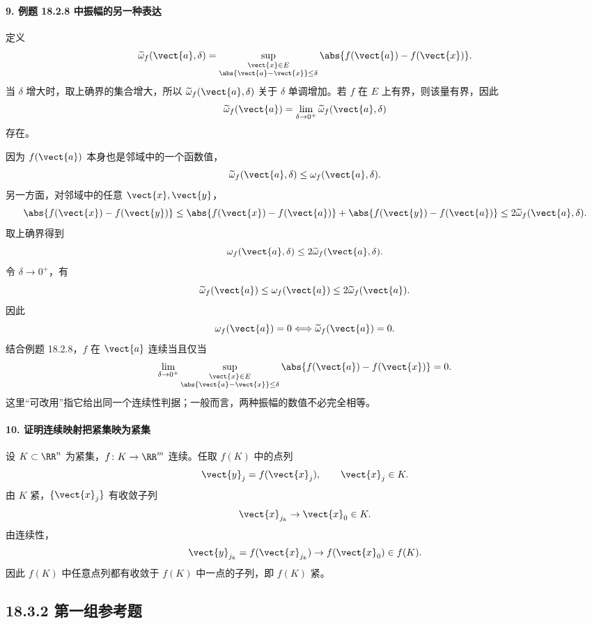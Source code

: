 \paragraph{9. 例题 18.2.8 中振幅的另一种表达}
\begin{xsolution}
定义
\[
  \widetilde\omega_f(\vect{a},\delta)
  =\sup_{\substack{\vect{x}\in E\\
  \abs{\vect{a}-\vect{x}}\le\delta}}
  \abs{f(\vect{a})-f(\vect{x})}.
\]
当 $\delta$ 增大时，取上确界的集合增大，所以 $\widetilde\omega_f(\vect{a},\delta)$ 关于 $\delta$ 单调增加。若 $f$ 在 $E$ 上有界，则该量有界，因此
\[
  \widetilde\omega_f(\vect{a})
  =\lim_{\delta\to0^+}\widetilde\omega_f(\vect{a},\delta)
\]
存在。

因为 $f(\vect{a})$ 本身也是邻域中的一个函数值，
\[
  \widetilde\omega_f(\vect{a},\delta)
  \le\omega_f(\vect{a},\delta).
\]
另一方面，对邻域中的任意 $\vect{x},\vect{y}$，
\[
  \abs{f(\vect{x})-f(\vect{y})}
  \le
  \abs{f(\vect{x})-f(\vect{a})}
  +\abs{f(\vect{y})-f(\vect{a})}
  \le2\widetilde\omega_f(\vect{a},\delta).
\]
取上确界得到
\[
  \omega_f(\vect{a},\delta)
  \le2\widetilde\omega_f(\vect{a},\delta).
\]
令 $\delta\to0^+$，有
\[
  \widetilde\omega_f(\vect{a})
  \le\omega_f(\vect{a})
  \le2\widetilde\omega_f(\vect{a}).
\]
因此
\[
  \omega_f(\vect{a})=0
  \Longleftrightarrow
  \widetilde\omega_f(\vect{a})=0.
\]
结合例题 18.2.8，$f$ 在 $\vect{a}$ 连续当且仅当
\[
  \lim_{\delta\to0^+}
  \sup_{\substack{\vect{x}\in E\\
  \abs{\vect{a}-\vect{x}}\le\delta}}
  \abs{f(\vect{a})-f(\vect{x})}=0.
\]
这里“可改用”指它给出同一个连续性判据；一般而言，两种振幅的数值不必完全相等。
\end{xsolution}

\paragraph{10. 证明连续映射把紧集映为紧集}
\begin{xsolution}
设 $K\subset\RR^n$ 为紧集，$f\colon K\to\RR^m$ 连续。任取 $f(K)$ 中的点列
\[
  \vect{y}_j=f(\vect{x}_j),
  \qquad \vect{x}_j\in K.
\]
由 $K$ 紧，$\{\vect{x}_j\}$ 有收敛子列
\[
  \vect{x}_{j_k}\to\vect{x}_0\in K.
\]
由连续性，
\[
  \vect{y}_{j_k}
  =f(\vect{x}_{j_k})
  \to f(\vect{x}_0)\in f(K).
\]
因此 $f(K)$ 中任意点列都有收敛于 $f(K)$ 中一点的子列，即 $f(K)$ 紧。
\end{xsolution}

\subsection*{18.3.2 第一组参考题}

